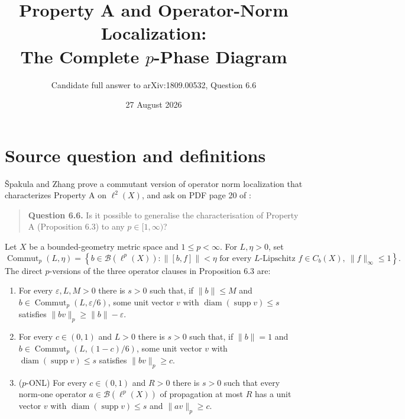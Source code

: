 \documentclass[11pt]{article}
\title{Property A and Operator-Norm Localization:\\
The Complete \(p\)-Phase Diagram}
\author{Candidate full answer to arXiv:1809.00532, Question 6.6}
\date{27 August 2026}
\newcommand{\Commut}{\operatorname{Commut}}
\newcommand{\diam}{\operatorname{diam}}
\newcommand{\supp}{\operatorname{supp}}
\newcommand{\B}{\mathcal B}
\begin{document}
\maketitle

\begin{center}
\end{center}

\section{Source question and definitions}

Špakula and Zhang prove a commutant version of operator norm localization that
characterizes Property A on $\ell^2(X)$, and ask on PDF page 20 of \cite{SZ}:

\begin{quote}
\textbf{Question 6.6.} Is it possible to generalise the characterisation of
Property A (Proposition 6.3) to any $p\in[1,\infty)$?
\end{quote}

Let $X$ be a bounded-geometry metric space and $1\le p<\infty$. For
$L,\eta>0$, set
\[
 \Commut_p(L,\eta)=\left\{b\in\B(\ell^p(X)):
 \|[b,f]\|<\eta\text{ for every $L$-Lipschitz }
 f\in C_b(X),\ \|f\|_\infty\le1\right\}.
\]
The direct $p$-versions of the three operator clauses in Proposition 6.3 are:

\begin{enumerate}[label=$(\mathrm{L}_{\arabic*}^p)$,leftmargin=3.1em]
\item For every $\varepsilon,L,M>0$ there is $s>0$ such that, if
$\|b\|\le M$ and $b\in\Commut_p(L,\varepsilon/6)$, some unit vector $v$ with
$\diam(\supp v)\le s$ satisfies $\|bv\|_p\ge\|b\|-\varepsilon$.

\item For every $c\in(0,1)$ and $L>0$ there is $s>0$ such that, if
$\|b\|=1$ and $b\in\Commut_p(L,(1-c)/6)$, some unit vector $v$ with
$\diam(\supp v)\le s$ satisfies $\|bv\|_p\ge c$.

\item ($p$-ONL) For every $c\in(0,1)$ and $R>0$ there is $s>0$ such that
every norm-one operator $a\in\B(\ell^p(X))$ of propagation at most $R$ has a
unit vector $v$ with $\diam(\supp v)\le s$ and $\|av\|_p\ge c$.
\end{enumerate}
\end{document}
